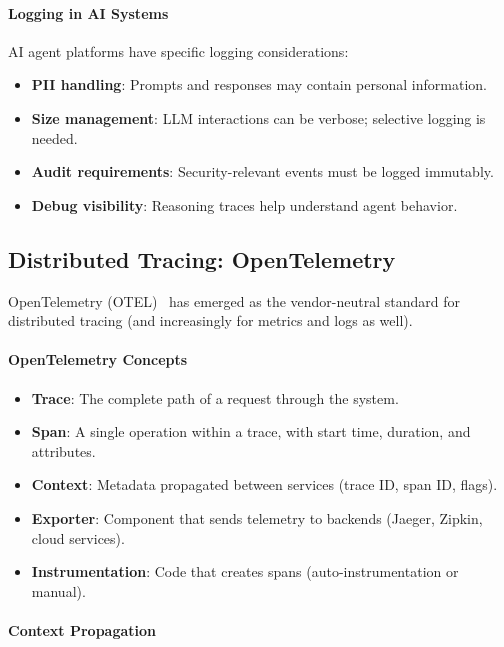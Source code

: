 \documentclass[a4paper,twoside]{sapthesis}
\begin{document}
\paragraph{Logging in AI Systems}

AI agent platforms have specific logging considerations:
\begin{itemize}
    \item \textbf{PII handling}: Prompts and responses may contain personal information.
    \item \textbf{Size management}: LLM interactions can be verbose; selective logging is needed.
    \item \textbf{Audit requirements}: Security-relevant events must be logged immutably.
    \item \textbf{Debug visibility}: Reasoning traces help understand agent behavior.
\end{itemize}

\subsection{Distributed Tracing: OpenTelemetry}

OpenTelemetry (OTEL)~\cite{opentelemetry2023}
has emerged as the vendor-neutral standard for distributed tracing (and increasingly for metrics and logs as well).

\paragraph{OpenTelemetry Concepts}

\begin{itemize}
    \item \textbf{Trace}: The complete path of a request through the system.
    \item \textbf{Span}: A single operation within a trace, with start time, duration, and attributes.
    \item \textbf{Context}: Metadata propagated between services (trace ID, span ID, flags).
    \item \textbf{Exporter}: Component that sends telemetry to backends (Jaeger, Zipkin, cloud services).
    \item \textbf{Instrumentation}: Code that creates spans (auto-instrumentation or manual).
\end{itemize}

\paragraph{Context Propagation}
\end{document}
